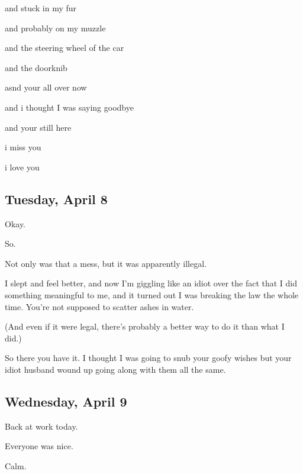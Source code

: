 {
and stuck in my fur

and probably on my muzzle

and the steering wheel of the car

and the doorknib

asnd your all over now

and i thought I was saying goodbye

and your still here

i miss you

i love you

\newpage

\subsection*{Tuesday, April 8}\label{tuesday-april-8}

Okay.

So.

Not only was that a mess, but it
was apparently illegal.

I slept and feel better, and now
I'm giggling like an idiot over the fact that I did something meaningful
to me, and it turned out I was breaking the law the whole time. You're
not supposed to scatter ashes in water.

(And even if it were legal, there's
probably a better way to do it than what I did.)

So there you have it. I thought I
was going to snub your goofy wishes but your idiot husband wound up
going along with them all the same.

\newpage

\subsection*{Wednesday, April 9}\label{wednesday-april-9}

Back at work today.

Everyone was nice.

Calm.

}
